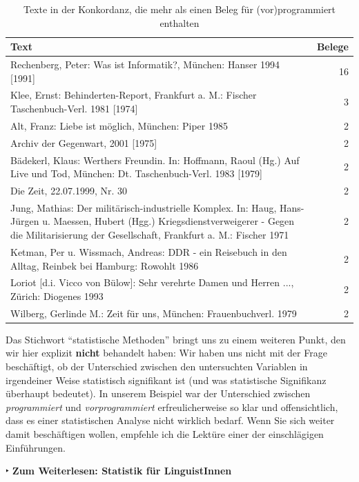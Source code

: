 \documentclass[]{article}
\begin{document}
\begin{table}[t]

\caption{\label{tab:textverteilung}Texte in der Konkordanz, die mehr als einen Beleg für (vor)programmiert enthalten}
\centering
\begin{tabular}{lr}
\toprule
Text & Belege\\
\midrule
Rechenberg, Peter: Was ist Informatik?, München: Hanser 1994 [1991] & 16\\
Klee, Ernst: Behinderten-Report, Frankfurt a. M.: Fischer Taschenbuch-Verl. 1981 [1974] & 3\\
Alt, Franz: Liebe ist möglich, München: Piper 1985 & 2\\
Archiv der Gegenwart, 2001 [1975] & 2\\
Bädekerl, Klaus: Werthers Freundin. In: Hoffmann, Raoul (Hg.) Auf Live und Tod, München: Dt. Taschenbuch-Verl. 1983 [1979] & 2\\
\addlinespace
Die Zeit, 22.07.1999, Nr. 30 & 2\\
Jung, Mathias: Der militärisch-industrielle Komplex. In: Haug, Hans-Jürgen u. Maessen, Hubert (Hgg.) Kriegsdienstverweigerer - Gegen die Militarisierung der Gesellschaft, Frankfurt a. M.: Fischer 1971 & 2\\
Ketman, Per u. Wissmach, Andreas: DDR - ein Reisebuch in den Alltag, Reinbek bei Hamburg: Rowohlt 1986 & 2\\
Loriot [d.i. Vicco von Bülow]: Sehr verehrte Damen und Herren ..., Zürich: Diogenes 1993 & 2\\
Wilberg, Gerlinde M.: Zeit für uns, München: Frauenbuchverl. 1979 & 2\\
\bottomrule
\end{tabular}
\end{table}

Das Stichwort ``statistische Methoden'' bringt uns zu einem weiteren
Punkt, den wir hier explizit \textbf{nicht} behandelt haben: Wir haben
uns nicht mit der Frage beschäftigt, ob der Unterschied zwischen den
untersuchten Variablen in irgendeiner Weise statistisch signifikant ist
(und was statistische Signifikanz überhaupt bedeutet). In unserem
Beispiel war der Unterschied zwischen \emph{programmiert} und
\emph{vorprogrammiert} erfreulicherweise so klar und offensichtlich,
dass es einer statistischen Analyse nicht wirklich bedarf. Wenn Sie sich
weiter damit beschäftigen wollen, empfehle ich die Lektüre einer der
einschlägigen Einführungen.

 ‣ \textbf{Zum Weiterlesen: Statistik für LinguistInnen}
\end{document}
